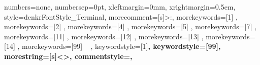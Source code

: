 {%
	numbers=none,%
	numbersep=0pt,%
	xleftmargin=0mm,%
	xrightmargin=0.5em,%
	style=denkrFontStyle_Terminal,%
	morecomment=[s]{>}{:},%
	morekeywords=[1]{%
	},%
	morekeywords=[2]{%
	},%
	morekeywords=[4]{%
	},%
	morekeywords=[5]{%
	},%
	morekeywords=[7]{%
	},%
	morekeywords=[11]{%
	},%
	morekeywords=[12]{%
	},%
	morekeywords=[13]{%
	},%
	morekeywords=[14]{%
	},%
	morekeywords=[99]{%
		~
	},%
	keywordstyle=[1]\color{lstCol_C_purple}\bfseries,%
	keywordstyle=[99]\color{lstCol_Terminal_signs},%
	morestring=[s]{<}{>},%
	commentstyle=\color{lstCol_Terminal_user}\bfseries,%
}%
%
%
%
%
%
\makeatletter
\newdimen\DenKrLst@baselength\setlength{\DenKrLst@baselength}{0.44em}%
\newdimen\DenKrLst@boxlength%
%
\def\DenKrLst@EscapeChar#1{%
	\expandafter\detokenize\expandafter{#1}%
}%
\def\DenKrLst@SplitChar#1#2{%
    \StrSplit{#2}{#1}\tempa\tempb%
	\DenKrLst@EscapeChar{\tempa}%
    \let\tempa\empty%
    \unless\ifx\tempb\empty\def\tempa{\hss\DenKrLst@SplitChar{#1}{\tempb}}\fi%
    \tempa%
}%
%
\newcommand{\DenKrLst@textstretched}[1]{%
	\StrLen{#1}[\tmpval]%
	\setlength{\DenKrLst@boxlength}{\tmpval\DenKrLst@baselength}%
	\hbox to \DenKrLst@boxlength{\DenKrLst@SplitChar{1}{#1}}%
}%
%
\newcommand{\DenKrLstBreakoutText}[1]{%
	\DenKrLst@textstretched{#1}%
}
\makeatother%
